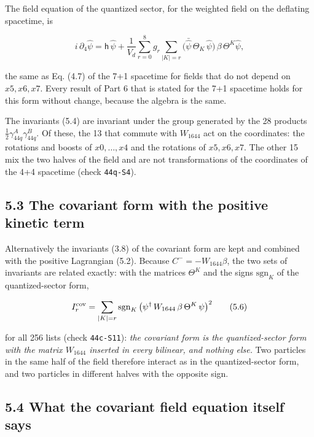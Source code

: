 \documentclass[
  10pt,
]{article}
\begin{document}
The field equation of the quantized sector, for the weighted field on
the deflating spacetime, is

\[i\,\partial_4\hat\psi=\mathsf h\,\hat\psi+\frac1{V_d}\sum_{r=0}^{8}g_r\sum_{|K|=r}\big(\bar{\hat\psi}\,\Theta_K\,\hat\psi\big)\,\beta\,\Theta^K\hat\psi,\tag{5.5}\]

the same as Eq. (4.7) of the 7+1 spacetime for fields that do not depend
on \(x5,x6,x7\). Every result of Part 6 that is stated for the 7+1
spacetime holds for this form without change, because the algebra is the
same.

The invariants (5.4) are invariant under the group generated by the 28
products \(\tfrac12\gamma_{44q}^A\gamma_{44q}^B\). Of these, the 13 that
commute with \(W_{1644}\) act on the coordinates: the rotations and
boosts of \(x0,\dots,x4\) and the rotations of \(x5,x6,x7\). The other
15 mix the two halves of the field and are not transformations of the
coordinates of the 4+4 spacetime (check \texttt{44q-S4}).

\hypertarget{the-covariant-form-with-the-positive-kinetic-term}{%
\subsection{5.3 The covariant form with the positive kinetic
term}\label{the-covariant-form-with-the-positive-kinetic-term}}

Alternatively the invariants (3.8) of the covariant form are kept and
combined with the positive Lagrangian (5.2). Because
\(C^-=-W_{1644}\beta\), the two sets of invariants are related exactly:
with the matrices \(\Theta^K\) and the signs \(\mathrm{sgn}_K\) of the
quantized-sector form,

\[I_r^{\rm cov}=\sum_{|K|=r}\mathrm{sgn}_K\,\big(\psi^\dagger\,W_{1644}\,\beta\,\Theta^K\,\psi\big)^2\tag{5.6}\]

for all 256 lists (check \texttt{44c-S11}): \emph{the covariant form is
the quantized-sector form with the matrix \(W_{1644}\) inserted in every
bilinear, and nothing else.} Two particles in the same half of the field
therefore interact as in the quantized-sector form, and two particles in
different halves with the opposite sign.

\hypertarget{what-the-covariant-field-equation-itself-says}{%
\subsection{5.4 What the covariant field equation itself
says}\label{what-the-covariant-field-equation-itself-says}}
\end{document}
